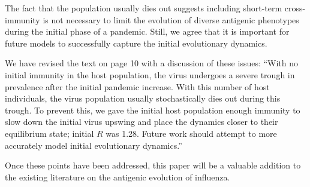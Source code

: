 \documentclass[11pt,oneside,letterpaper]{article}
\def\comment#1{
#1
}
\def\response#1{
\begin{bf}
#1
\end{bf}
}
\def\break{\vspace{0.2cm}}
\begin{document}
\response{The fact that the population usually dies out suggests including short-term cross-immunity is not necessary to limit the evolution of diverse antigenic phenotypes during the initial phase of a pandemic.  Still, we agree that it is important for future models to successfully capture the initial evolutionary dynamics.}

\response{We have revised the text on page 10 with a discussion of these issues: ``With no initial immunity in the host population, the virus undergoes a severe trough in prevalence after the initial pandemic increase.  With this number of host individuals, the virus population usually stochastically dies out during this trough.  To prevent this, we gave the initial host population enough immunity to slow down the initial virus upswing and place the dynamics closer to their equilibrium state; initial $R$ was 1.28.  Future work should attempt to more accurately model initial evolutionary dynamics.''}

\break

\comment{Once these points have been addressed, this paper will be a valuable addition to the existing literature on the antigenic evolution of influenza.}



\end{document}

